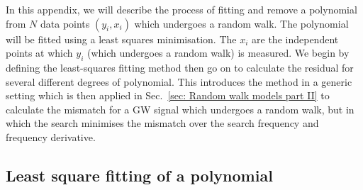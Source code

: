 In this appendix, we will describe the process of fitting and remove a
polynomial from $N$ data points $(y_i, x_i)$ which undergoes a random walk. The
polynomial will be fitted using a least squares minimisation. The $x_i$ are
the independent points at which $y_i$ (which undergoes a random walk) is
measured. We begin by defining the least-squares fitting method then
go on to calculate the residual for several different degrees of polynomial.
This introduces the method in a generic setting which is then applied
in Sec.~\ref{sec: Random walk models part II} to calculate the mismatch for
a GW signal which undergoes a random walk, but in which the search minimises
the mismatch over the search frequency and frequency derivative.

\subsection{Least square fitting of a polynomial}

